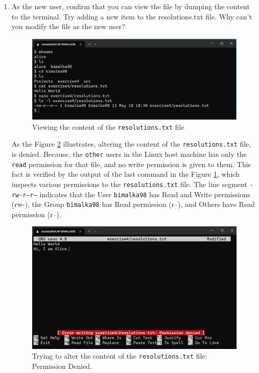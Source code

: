 \documentclass[11pt,letterpaper]{article}
\newenvironment{answer}{\em \color{blue} \begin{adjustwidth}{1cm}{1cm}}{\end{adjustwidth}}
\begin{document}
\begin{enumerate}
		
		\item As the new user, confirm that you can view the file by dumping the content to the terminal. Try adding a new item to the resolutions.txt file. Why can’t you modify the file as the new user?
		
		\begin{answer}
			\begin{figure}[H]
				\centering
				\includegraphics[width=0.65\columnwidth]{images/q7_1}
				\caption{Viewing the content of the {\tt resolutions.txt} file} \label{fig:q7_1}
			\end{figure}
		
		As the Figure \ref{fig:q7_2} illustrates, altering the content of the {\tt resolutions.txt} file, is denied. Because, the {\tt other} users in the Linux host machine has only the {\tt read}  permission for that file, and no write permission is given to them. This fact is verified by the output of the last command in the Figure \ref{fig:q7_1}, which inspects various permissions to the {\tt resolutions.txt} file. The line segment {\tt -rw-r--r--} indicates that the User {\tt bimalka98} has Read and Write permissions (rw-), the Group {\tt bimalka98} has Read permission (r--), and Others have Read permission (r--).

		
			\begin{figure}[H]
				\centering
				\includegraphics[width=0.65\columnwidth]{images/q7_2}
				\caption{Trying to alter the content of the {\tt resolutions.txt} file: Permission Denied.} \label{fig:q7_2}
			\end{figure}
		\end{answer}
		

\end{enumerate}
\end{document}
